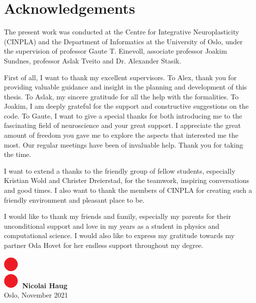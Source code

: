 \chapter*{Acknowledgements}
\thispagestyle{plain}

The present work was conducted at the Centre for Integrative Neuroplasticity (CINPLA) and the Department of Informatics at the University of Oslo, under the supervision of professor Gaute T. Einevoll, associate professor Joakim Sundnes, professor Aslak Tveito and Dr. Alexander Stasik. 

First of all, I want to thank my excellent supervisors. To Alex, thank you for providing valuable guidance and insight in the planning and development of this thesis. To Aslak, my sincere gratitude for all the help with the formalities. To Joakim, I am deeply grateful for the support and constructive suggestions on the code. To Gaute, I want to give a special thanks for both introducing me to the fascinating field of neuroscience and your great support. I appreciate the great amount of freedom you gave me to explore the aspects that interested me the most. Our regular meetings have been of invaluable help. Thank you for taking the time. 

I want to extend a thanks to the friendly group of fellow students, especially Kristian Wold and Christer Dreierstad, for the teamwork, inspiring conversations and good times. I also want to thank the members of CINPLA for creating such a friendly environment and pleasant place to be. 

I would like to thank my friends and family, especially my parents for their unconditional support and love in my years as a student in physics and computational science. I would also like to express my gratitude towards my partner Oda Hovet for her endless support throughout my degree. 
\\ [8 pt]


\begin{flushright}
\includegraphics[height = 1.5ex]{latex/latex-report/3_Images/Logo/UiO/uio-colon.pdf}\, \textbf{Nicolai Haug}
\\
Oslo, November 2021
\end{flushright}
